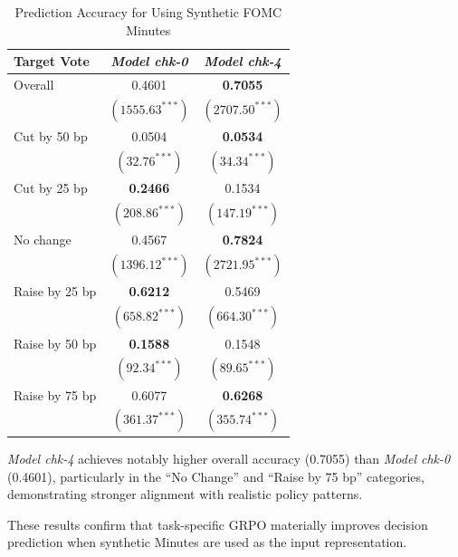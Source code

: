 \begin{table}[htbp]
    \centering
      \begin{tabular}{lcc}
      \toprule
      \textbf{Target Vote} & \textit{Model chk-0} & \textit{Model chk-4} \\
      \midrule
      Overall & 0.4601 & \textbf{0.7055}\\
              & $({1555.63}^{***})$ & $({2707.50}^{***})$\\[0.3em]

      Cut by 50 bp & 0.0504 & \textbf{0.0534}\\
                   & $({32.76}^{***})$ & $({34.34}^{***})$\\[0.3em]

      Cut by 25 bp & \textbf{0.2466} & 0.1534\\
                   & $({208.86}^{***})$ & $({147.19}^{***})$\\[0.3em]

      No change & 0.4567 & \textbf{0.7824}\\
                & $({1396.12}^{***})$ & $({2721.95}^{***})$\\[0.3em]

      Raise by 25 bp & \textbf{0.6212} & 0.5469\\
                     & $({658.82}^{***})$ & $({664.30}^{***})$\\[0.3em]

      Raise by 50 bp & \textbf{0.1588} & 0.1548\\
                     & $({92.34}^{***})$ & $({89.65}^{***})$\\[0.3em]

      Raise by 75 bp & 0.6077 & \textbf{0.6268}\\
                     & $({361.37}^{***})$ & $({355.74}^{***})$\\
      \bottomrule
      \end{tabular}
    \caption{Prediction Accuracy for Using Synthetic FOMC Minutes}
    \label{tab:ch2:decision_acc_synthetic}
\end{table}


\textit{Model chk-4} achieves notably higher overall accuracy (0.7055) than \textit{Model chk-0} (0.4601), particularly in the “No Change” and “Raise by 75 bp” categories, demonstrating stronger alignment with realistic policy patterns.


These results confirm that task-specific GRPO materially improves decision prediction when synthetic Minutes are used as the input representation. 

